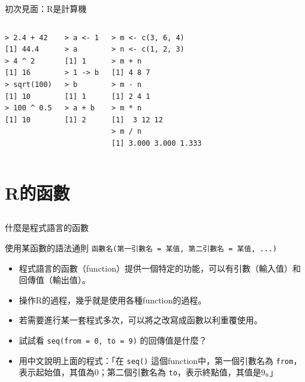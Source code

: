 \documentclass[14pt, aspectratio=43]{beamer}
\begin{document}
\begin{frame}[fragile]{初次見面：R是計算機}
\begin{columns}
\begin{verbatim}
> 2.4 + 42
[1] 44.4
> 4 ^ 2
[1] 16
> sqrt(100)
[1] 10
> 100 ^ 0.5
[1] 10
\end{verbatim}

\begin{verbatim}
> a <- 1
> a
[1] 1
> 1 -> b
> b
[1] 1
> a + b
[1] 2
\end{verbatim}

\begin{verbatim}
> m <- c(3, 6, 4)
> n <- c(1, 2, 3)
> m + n
[1] 4 8 7
> m - n
[1] 2 4 1
> m * n
[1]  3 12 12
> m / n
[1] 3.000 3.000 1.333
\end{verbatim}


\end{columns}
\end{frame}



\section{R的函數}\subsection{}

\begin{frame}[fragile]{什麼是程式語言的函數}

\begin{block}{使用某函數的語法通則}
\verb+函數名(第一引數名 = 某值, 第二引數名 = 某值, ...)+ 
\end{block}

\begin{itemize}
\item 程式語言的函數（function）提供一個特定的功能，可以有引數（輸入值）和回傳值（輸出值）。
\item 操作R的過程，幾乎就是使用各種function的過程。
\item 若需要進行某一套程式多次，可以將之改寫成函數以利重覆使用。
\item 試試看 \verb+seq(from = 0, to = 9)+ 的回傳值是什麼？
\item 用中文說明上面的程式：「在 \verb+seq()+ 這個function中，第一個引數名為 \verb+from+，表示起始值，其值為0；第二個引數名為 \verb+to+，表示終點值，其值是9。」
\end{itemize}
\end{frame}
\end{document}
